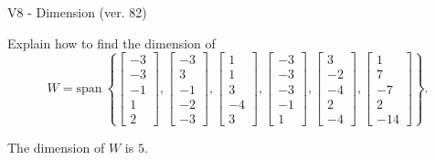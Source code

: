 \begin{exercise}
  \begin{exerciseTitle}V8 - Dimension (ver. 82)\end{exerciseTitle}
  \begin{exerciseStatement}
    Explain how to find the dimension of 
\[W=\mathrm{span}\ \left\{\left[\begin{array}{r}
-3 \\
-3 \\
-1 \\
1 \\
2
\end{array}\right] , \left[\begin{array}{r}
-3 \\
3 \\
-1 \\
-2 \\
-3
\end{array}\right] , \left[\begin{array}{r}
1 \\
1 \\
3 \\
-4 \\
3
\end{array}\right] , \left[\begin{array}{r}
-3 \\
-3 \\
-3 \\
-1 \\
1
\end{array}\right] , \left[\begin{array}{r}
3 \\
-2 \\
-4 \\
2 \\
-4
\end{array}\right] , \left[\begin{array}{r}
1 \\
7 \\
-7 \\
2 \\
-14
\end{array}\right]\right\}.\]



  \end{exerciseStatement}
  \begin{exerciseAnswer}
   The dimension of \(W\) is  \(5\).
  


  \end{exerciseAnswer}
\end{exercise}